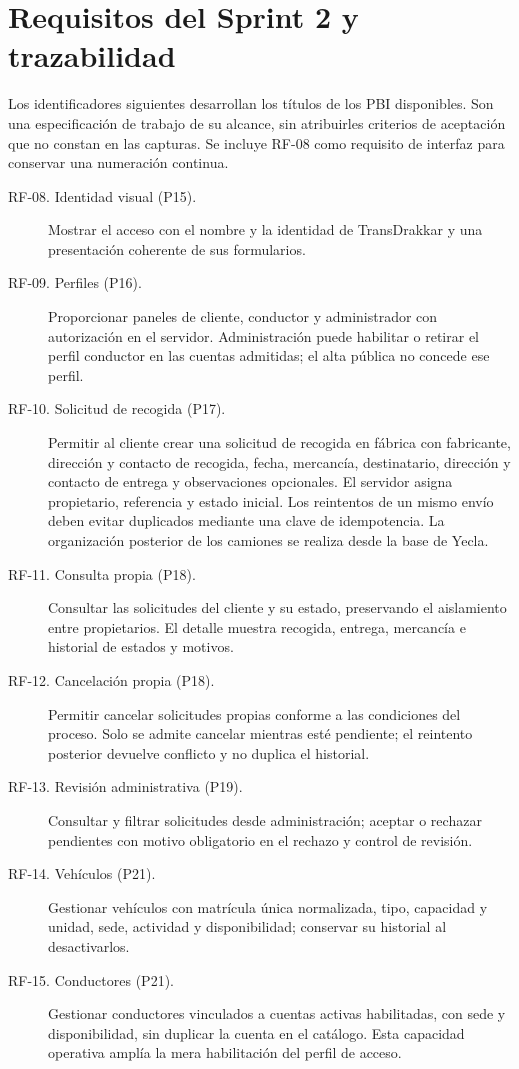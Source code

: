 \section{Requisitos del Sprint 2 y trazabilidad}
Los identificadores siguientes desarrollan los títulos de los PBI disponibles. Son una especificación de trabajo de su alcance, sin atribuirles criterios de aceptación que no constan en las capturas. Se incluye RF-08 como requisito de interfaz para conservar una numeración continua.
\begin{description}
\item[RF-08. Identidad visual (P15).] Mostrar el acceso con el nombre y la identidad de TransDrakkar y una presentación coherente de sus formularios.
\item[RF-09. Perfiles (P16).] Proporcionar paneles de cliente, conductor y administrador con autorización en el servidor. Administración puede habilitar o retirar el perfil conductor en las cuentas admitidas; el alta pública no concede ese perfil.
\item[RF-10. Solicitud de recogida (P17).] Permitir al cliente crear una solicitud de recogida en fábrica con fabricante, dirección y contacto de recogida, fecha, mercancía, destinatario, dirección y contacto de entrega y observaciones opcionales. El servidor asigna propietario, referencia y estado inicial. Los reintentos de un mismo envío deben evitar duplicados mediante una clave de idempotencia. La organización posterior de los camiones se realiza desde la base de Yecla.
\item[RF-11. Consulta propia (P18).] Consultar las solicitudes del cliente y su estado, preservando el aislamiento entre propietarios. El detalle muestra recogida, entrega, mercancía e historial de estados y motivos.
\item[RF-12. Cancelación propia (P18).] Permitir cancelar solicitudes propias conforme a las condiciones del proceso. Solo se admite cancelar mientras esté pendiente; el reintento posterior devuelve conflicto y no duplica el historial.
\item[RF-13. Revisión administrativa (P19).] Consultar y filtrar solicitudes desde administración; aceptar o rechazar pendientes con motivo obligatorio en el rechazo y control de revisión.
\item[RF-14. Vehículos (P21).] Gestionar vehículos con matrícula única normalizada, tipo, capacidad y unidad, sede, actividad y disponibilidad; conservar su historial al desactivarlos.
\item[RF-15. Conductores (P21).] Gestionar conductores vinculados a cuentas activas habilitadas, con sede y disponibilidad, sin duplicar la cuenta en el catálogo. Esta capacidad operativa amplía la mera habilitación del perfil de acceso.

\end{description}
